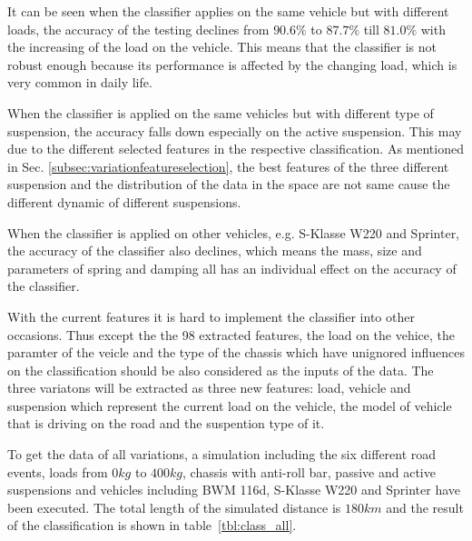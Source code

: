 It can be seen when the classifier applies on the same vehicle but with different loads, the accuracy of the testing declines from $90.6\%$ to $87.7\%$ till $81.0\%$ with the increasing of the load on the vehicle.
%
This means that the classifier is not robust enough because its performance is affected by the changing load, which is very common in daily life.

When the classifier is applied on the same vehicles but with different type of suspension, the accuracy falls down especially on the active suspension.
%
This may due to the different selected features in the respective classification.
%
As mentioned in Sec. \ref{subsec:variationfeatureselection}, the best features of the three different suspension and the distribution of the data in the space are not same cause the different dynamic of different suspensions.
%

When the classifier is applied on other vehicles, e.g. S-Klasse W220 and Sprinter, the accuracy of the classifier also declines, which means the mass, size and parameters of spring and damping all has an individual effect on the accuracy of the classifier.

With the current features it is hard to implement the classifier into other occasions.
%
Thus except the the 98 extracted features, the load on the vehice, the paramter of the veicle and the type of the chassis which have unignored influences on the classification should be also considered as the inputs of the data.
%
The three variatons will be extracted as three new features: load, vehicle and suspension which represent the current load on the vehicle, the model of vehicle that is driving on the road and the suspention type of it.

To get the data of all variations, a simulation including the six different road events, loads from $0kg$ to $400kg$, chassis with anti-roll bar, passive and active suspensions and vehicles including BWM 116d, S-Klasse W220 and Sprinter have been executed.
%
The total length of the simulated distance is $180km$ and  the result of the classification is shown in table~\ref{tbl:class_all}.

